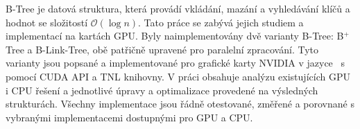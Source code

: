 B-Tree je datová struktura, která provádí vkládání, mazání a vyhledávání klíčů a hodnot se složitostí $\mathcal{O}(\log{n})$. Tato práce se zabývá jejich studiem a implementací na kartách GPU. Byly naimplementovány dvě varianty B-Tree: B$^+$Tree a B-Link-Tree, obě patřičně upravené pro paralelní zpracování. Tyto varianty jsou popsané a implementované pro grafické karty NVIDIA v jazyce \CC\ s pomocí CUDA API a TNL knihovny. V práci obsahuje analýzu existujících GPU i CPU řešení a jednotlivé úpravy a optimalizace provedené na výsledných strukturách. Všechny implementace jsou řádně otestované, změřené a porovnané s vybranými implementacemi dostupnými pro GPU a CPU.